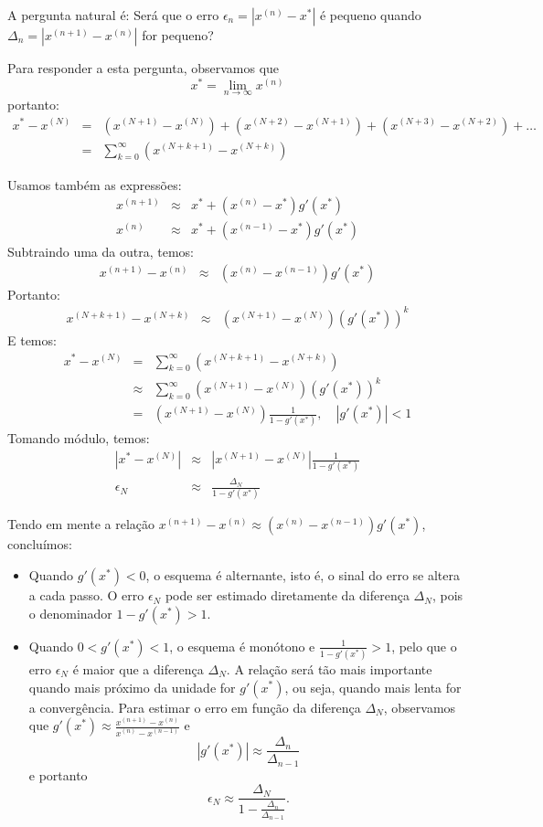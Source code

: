 A pergunta natural é: Será que o erro $\epsilon_n=\left|x^{(n)}-x^*\right|$ é pequeno quando  $\Delta_n=\left|x^{(n+1)}-x^{(n)}\right|$ for pequeno?

Para responder a esta pergunta, observamos que
$$x^*=\lim_{n\to \infty }x^{(n)}$$
portanto:
\begin{eqnarray*}
x^*-x^{(N)}&=&  \left(x^{(N+1)}-x^{(N)}\right)+\left(x^{(N+2)}-x^{(N+1)}\right)+\left(x^{(N+3)}-x^{(N+2)}\right)+\ldots\\
&=&\sum_{k=0}^\infty \left(x^{(N+k+1)}-x^{(N+k)}\right)
\end{eqnarray*}

Usamos também as expressões:
\begin{eqnarray*}
x^{(n+1)}&\approx& x^*+(x^{(n)}-x^*) g'(x^*)\\
x^{(n)}&\approx& x^*+(x^{(n-1)}-x^*) g'(x^*)
\end{eqnarray*}
Subtraindo uma da outra, temos:
\begin{eqnarray*}
x^{(n+1)}-x^{(n)}&\approx& (x^{(n)}-x^{(n-1)}) g'(x^*)
\end{eqnarray*}
Portanto:
\begin{eqnarray*}
x^{(N+k+1)}-x^{(N+k)}&\approx& (x^{(N+1)}-x^{(N)}) \left(g'(x^*)\right)^{k}
\end{eqnarray*}
E temos:
\begin{eqnarray*}
x^*-x^{(N)}
&=&\sum_{k=0}^\infty \left(x^{(N+k+1)}-x^{(N+k)}\right)\\
&\approx&\sum_{k=0}^\infty (x^{(N+1)}-x^{(N)}) \left(g'(x^*)\right)^{k}\\
&=&(x^{(N+1)}-x^{(N)}) \frac{1}{1-g'(x^*)}, \quad \left|g'(x^*)\right|<1
\end{eqnarray*}
Tomando módulo, temos:
\begin{eqnarray*}
\left|x^*-x^{(N)} \right|
&\approx&\left|x^{(N+1)}-x^{(N)}\right| \frac{1}{1-g'(x^*)}\\
\epsilon_N &\approx&  \frac{\Delta_N}{1-g'(x^*)}
\end{eqnarray*}

\begin{obs}
Tendo em mente a relação $x^{(n+1)}-x^{(n)}  \approx (x^{(n)}-x^{(n-1)}) g'(x^*)$, concluímos:
\begin{itemize}

\item Quando $g'(x^*)<0$, o esquema é alternante, isto é, o sinal do erro se altera a cada passo.  O erro $\epsilon_N$ pode ser estimado diretamente da diferença $\Delta_N$, pois o denominador $1-g'(x^*)>1$.
\item Quando $0<g'(x^*)<1$, o esquema é monótono e $\frac{1}{1-g'(x^*)}>1$, pelo que o erro $\epsilon_N$ é maior que a diferença $\Delta_N$. A relação será tão mais importante quando mais próximo da unidade for $g'(x^*)$, ou seja, quando mais lenta for a convergência. Para estimar o erro em função da diferença $\Delta_N$, observamos que  $g'(x^*)\approx \frac{x^{(n+1)}-x^{(n)}}{x^{(n)}-x^{(n-1)}}$ e 
$$\left|g'(x^*)\right|\approx \frac{\Delta_n}{\Delta_{n-1}}$$
e portanto
$$\epsilon_N \approx \frac{\Delta_N}{1-\frac{\Delta_n}{\Delta_{n-1}}}.$$
\end{itemize}  
\end{obs}

